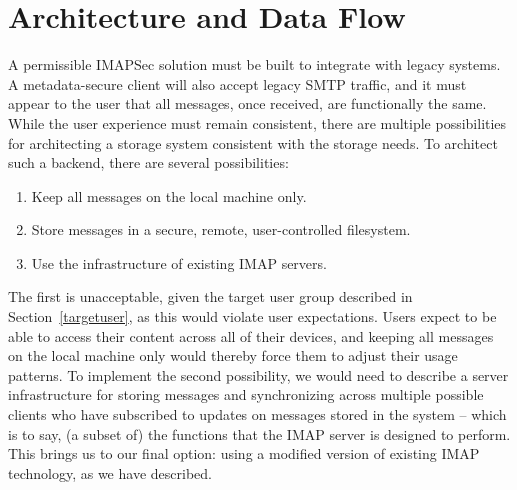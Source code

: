 \documentclass[pageno]{jpaper}
\newcommand{\project}{IMAPSec }
\begin{document}
\section{Architecture and Data Flow}
\label{architecture}


A permissible \project solution must be built to integrate with legacy systems. A metadata-secure client will also accept legacy SMTP traffic, and it must appear to the user that all messages, once received, are functionally the same. While the user experience must remain consistent, there are multiple possibilities for architecting a storage system consistent with the storage needs. To architect such a backend, there are several possibilities:

\begin{enumerate}
  \item Keep all messages on the local machine only.
    \item Store messages in a secure, remote, user-controlled filesystem.
    \item Use the infrastructure of existing IMAP servers.
\end{enumerate}

The first is unacceptable, given the target user group described in Section~\ref{targetuser}, as this would violate user expectations. Users expect to be able to access their content across all of their devices, and keeping all messages on the local machine only would thereby force them to adjust their usage patterns. To implement the second possibility, we would need to describe a server infrastructure for storing messages and synchronizing across multiple possible clients who have subscribed to updates on messages stored in the system -- which is to say, (a subset of) the functions that the IMAP server is designed to perform. This brings us to our final option: using a modified version of existing IMAP technology, as we have described.
\end{document}
